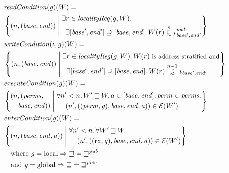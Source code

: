 \documentclass[compsoc,conference,letterpaper,fleqn]{IEEEtran}
\newcommand\subsetsim{\mathrel{\ooalign{\raise.2ex\hbox{$\subset$}\cr
      \hidewidth\lower.8ex\hbox{\scalebox{0.9}{$\sim$}}\hidewidth\cr}}}
\newcommand\supsetsim{\mathrel{\ooalign{\raise.2ex\hbox{$\supset$}\cr
      \hidewidth\lower.8ex\hbox{\scalebox{0.9}{$\sim$}}\hidewidth\cr}}}
\newcommand{\nsubsim}[1][n]{\stackrel{\tiny{#1}}{\subsetsim}}
\newcommand{\nsupsim}[1][n]{\stackrel{\tiny{#1}}{\supsetsim}}
\newcommand{\var}[1]{\mathit{#1}}
\newcommand{\gl}{\var{g}}
\newcommand{\addr}{\var{a}}
\newcommand{\start}{\var{base}}
\newcommand{\addrend}{\var{end}}
\newcommand{\perm}{\var{perm}}
\newcommand{\pwl}{\var{pwl}}
\newcommand{\plainfun}[2]{
  \ifthenelse{\equal{#2}{}}
  {\mathit{#1}}
  {\mathit{#1}(#2)}
}
\newcommand{\readCond}[1]{\plainfun{readCondition}{#1}}
\newcommand{\writeCond}[1]{\plainfun{writeCondition}{#1}}
\newcommand{\execCond}[1]{\plainfun{executeCondition}{#1}}
\newcommand{\entryCond}[1]{\plainfun{enterCondition}{#1}}
\newcommand{\future}{\mathbin{\sqsupseteq}}
\newcommand{\futurewk}{\mathbin{\sqsupseteq}^{\var{pub}}}
\newcommand{\futurestr}{\mathbin{\sqsupseteq}^{\var{priv}}}
\newcommand{\asmType}{\plaindom{AsmType}}
\newcommand{\plaindom}[1]{\mathrm{#1}}
\newcommand{\intr}[2]{\mathcal{#1}}
\newcommand{\exprintr}[1]{\intr{E}{#1}}
\newcommand{\stder}{\exprintr{\asmType}}
\newcommand{\npair}[2][n]{\left(#1,#2 \right)}
\newcommand{\npairP}[2][n]{(#1,#2)}
\newcommand{\plainperm}[1]{\mathrm{#1}}
\newcommand{\exec}{\plainperm{rx}}
\newcommand{\local}{\plainperm{local}}
\newcommand{\glob}{\plainperm{global}}
\begin{document}
{\begin{figure}[htbp]
  \centering
  \begin{align*}
  & \readCond{}(\gl)(W) =  \\
  & \left\{ \npair{(\start,\addrend)} \; \middle| \;
    \begin{aligned}
      & \exists r \in \var{localityReg}(g,W) \ldotp \\
      & \;\; \exists [\start',\addrend'] \supseteq [\start,\addrend] \ldotp W(r)\nsubsim[n] \iota_{\start',\addrend'}^\pwl 
    \end{aligned} \right\}\\
  & \writeCond{}(\iota,\gl)(W) =  \\
  & \left\{
    \npair{(\start,\addrend)}
    \; \middle| \;
    \begin{aligned}
      & \exists r \in \var{localityReg}(g,W) \ldotp  W(r) \text{\footnotesize{ is address-stratified and}} \\
      & \;\; \exists [\start',\addrend'] \supseteq [\start,\addrend] \ldotp W(r)\nsupsim[n-1] \iota_{\start',\addrend'}
    \end{aligned} \right\}\\
  & \execCond{}(\gl)(W) = \\
  & \left\{
    \begin{multlined}
      \npairP{(\var{perms}, \\
        \start,\addrend)}
    \end{multlined}
     \; \middle| \;
    \begin{aligned}
      & \forall n' < n, W' \future W, a \in [\start,\addrend], \perm \in \var{perms} \ldotp \\
      & \;\;\;\; \npair[n']{((\perm,\gl),\start,\addrend,\addr)} \in \stder(W')\\
    \end{aligned} \right\} \\
  & \entryCond{}(\gl)(W) = \\
  & \left\{ \npair{(\start,\addrend,\addr)} \; \middle| \;
    \begin{aligned}
 &  \forall n' < n \ldotp \forall W' \future W \ldotp\\
      & \quad \npair[n']{((\exec,\gl),\start,\addrend,\addr)} \in \stder(W')
    \end{aligned} \right\} \\
  & \quad \text{where } \gl = \local \Rightarrow \future = \futurewk \\
  & \quad \text{and } \gl = \glob \Rightarrow \future = \futurestr

\end{align*}
\end{figure}}
\end{document}
